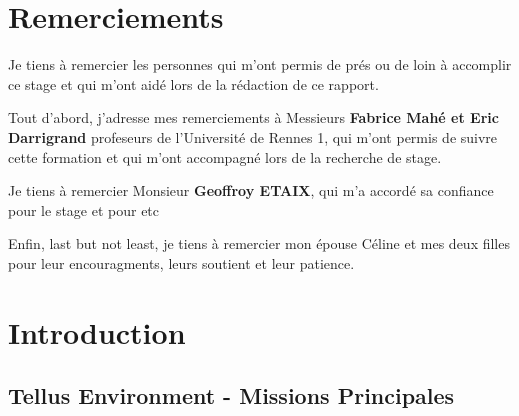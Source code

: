 \documentclass[12pt,a4paper]{report}
\newcounter{mypagecount}%
\newenvironment{interlude}{%
	\clearpage
	\setcounter{mypagecount}{\value{page}}%
	\thispagestyle{empty}%
	\pagestyle{empty}%
}{%
	\clearpage
	\setcounter{page}{\value{mypagecount}}%
}
\begin{document}
\begin{interlude}
\listoftodos
\end{interlude}


\cleardoublepage%

\chapter*{Remerciements}%
\thispagestyle{empty}%


Je tiens à remercier les personnes qui m'ont permis de prés ou de loin à accomplir ce stage et qui m'ont aidé lors de la rédaction de ce rapport.

Tout d'abord, j'adresse mes remerciements à Messieurs \textbf{Fabrice Mahé et Eric Darrigrand} profeseurs de l'Université de Rennes 1, qui m'ont permis de suivre cette formation et qui m'ont accompagné lors de la recherche de stage.

Je tiens à remercier Monsieur \textbf{Geoffroy ETAIX}, qui m'a accordé sa confiance pour le stage et pour etc 

Enfin, last but not least, je tiens à remercier mon épouse Céline et mes deux filles pour leur encouragments, leurs soutient et leur patience.


\tableofcontents
\newpage

\chapter{Introduction}
	\section{Tellus Environment - Missions Principales}
	
\end{document}
